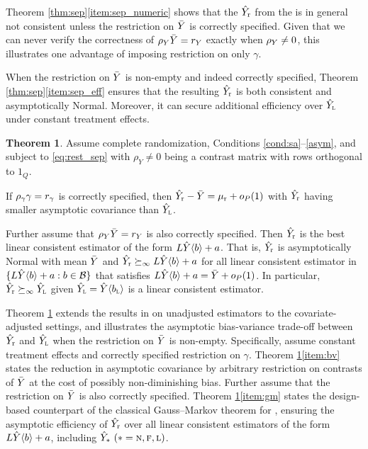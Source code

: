 \documentclass[11pt]{article}
\theoremstyle{definition}
\newtheorem{theorem}{Theorem}
\begin{document}
Theorem \ref{thm:sep}\eqref{item:sep_numeric} shows that the $\hat Y_{\textup{r}}$ from the {\sr}  is in general not consistent unless the restriction on $\bar Y$ is correctly specified.  
Given that we can never verify the correctness of $\rho_Y\bar Y = r_Y$ exactly when $\rho_Y \neq 0$, this illustrates one advantage of imposing restriction on only $\gamma$.  

When the restriction on $\bar Y$ is non-empty and indeed correctly specified, Theorem \ref{thm:sep}\eqref{item:sep_eff} ensures that the resulting $\hat Y_{\textup{r}}$ is both consistent and asymptotically Normal.
Moreover, it can secure additional efficiency over $\hat Y_{\textsc{l}}$ under constant treatment effects. 


\begin{theorem}\label{thm:gm}
Assume complete randomization, Conditions \ref{cond:sa}--\ref{asym}, and \rolss subject to \eqref{eq:rest_sep} with $\rho_Y\neq 0$ being a contrast matrix with rows orthogonal to $1_Q$. 
\begine[(i)]
\item \label{item:bv} If $\rho_\gamma\gamma = r_\gamma$ is correctly specified, then $\hat Y_{\textup{r}} - \bar Y  = \mu_{{\textup{r}} } + o_P(1)$ with $\hat Y_{\textup{r}}$ having smaller asymptotic covariance than $\hat Y_{\textsc{l}}$. %
\item \label{item:gm}
Further assume that $\rho_Y \bar Y = r_Y$ is also correctly specified. 
Then $\hat Y_{\textup{r}}$ is the best linear consistent estimator of the form $L\hat Y\langle b \rangle+ a$. 
That is, $\hat Y_{\textup{r}} $ is asymptotically Normal with mean $\bar Y$ and  $\hat Y_{\textup{r}} \succeq_\infty   L\hat Y\langle b \rangle+ a$ for all linear consistent estimator in $ \{ L \hat Y\langle b \rangle+ a: b\in\mathcal{B}\}$ that satisfies $L\hat Y\langle b \rangle+ a= \bar Y + o_P(1)$. 
In particular,  $\hat Y_{\textup{r}} \succeq_\infty \hat Y_{\textsc{l}}$ given $\hat Y_{\textsc{l}} = \hat Y\langle b_{\textsc{l}}\rangle$ is a linear consistent estimator.
\ende
\end{theorem}



Theorem \ref{thm:gm} extends the results in \citet[][Theorem A5]{ZDa} on unadjusted estimators to the covariate-adjusted settings,  and illustrates the asymptotic bias-variance trade-off between $\hat Y_{\textup{r}}$ and $\hat Y_{\textsc{l}}$ when the restriction on $\bar Y$ is non-empty.
Specifically, assume constant treatment effects and correctly specified restriction on $\gamma$. 
Theorem \ref{thm:gm}\eqref{item:bv} states the reduction in asymptotic covariance by arbitrary restriction on contrasts of $\bar Y$ at the cost of possibly non-diminishing bias. 
Further assume that the restriction on $\bar Y$ is also correctly specified. 
Theorem \ref{thm:gm}\eqref{item:gm} states the design-based counterpart of the classical Gauss--Markov theorem for \rls, ensuring the asymptotic efficiency of $\hat Y_{\textup{r}}$ over all linear consistent estimators of the form $L\hat Y\langle b \rangle +a$, including $\hat Y_* \ (* =\textsc{n}, \textsc{f}, \textsc{l})$.
\end{document}
